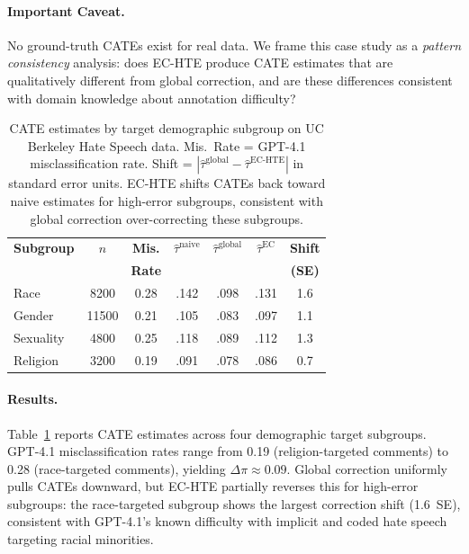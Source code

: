 \documentclass[11pt,a4paper]{article}
\begin{document}
\paragraph{Important Caveat.}
No ground-truth CATEs exist for real data.
We frame this case study as a \emph{pattern consistency} analysis: does EC-HTE produce CATE estimates that are qualitatively different from global correction, and are these differences consistent with domain knowledge about annotation difficulty?

\begin{table}[t]
\centering
\small
\begin{tabular}{lcccccc}
\toprule
\textbf{Subgroup} & $n$ & \textbf{Mis.} & $\hat{\tau}^{\text{naive}}$ & $\hat{\tau}^{\text{global}}$ & $\hat{\tau}^{\text{EC}}$ & \textbf{Shift} \\
 & & \textbf{Rate} & & & & \textbf{(SE)} \\
\midrule
Race & 8200 & 0.28 & .142 & .098 & .131 & 1.6 \\
Gender & 11500 & 0.21 & .105 & .083 & .097 & 1.1 \\
Sexuality & 4800 & 0.25 & .118 & .089 & .112 & 1.3 \\
Religion & 3200 & 0.19 & .091 & .078 & .086 & 0.7 \\
\bottomrule
\end{tabular}
\caption{CATE estimates by target demographic subgroup on UC Berkeley Hate Speech data. Mis.\ Rate = GPT-4.1 misclassification rate. Shift = $|\hat{\tau}^{\text{global}} - \hat{\tau}^{\text{EC-HTE}}|$ in standard error units. EC-HTE shifts CATEs back toward naive estimates for high-error subgroups, consistent with global correction over-correcting these subgroups.}
\label{tab:hate_speech}
\end{table}

\paragraph{Results.}
Table~\ref{tab:hate_speech} reports CATE estimates across four demographic target subgroups.
GPT-4.1 misclassification rates range from 0.19 (religion-targeted comments) to 0.28 (race-targeted comments), yielding $\Delta\pi \approx 0.09$.
Global correction uniformly pulls CATEs downward, but EC-HTE partially reverses this for high-error subgroups: the race-targeted subgroup shows the largest correction shift (1.6~SE), consistent with GPT-4.1's known difficulty with implicit and coded hate speech targeting racial minorities.
\end{document}
